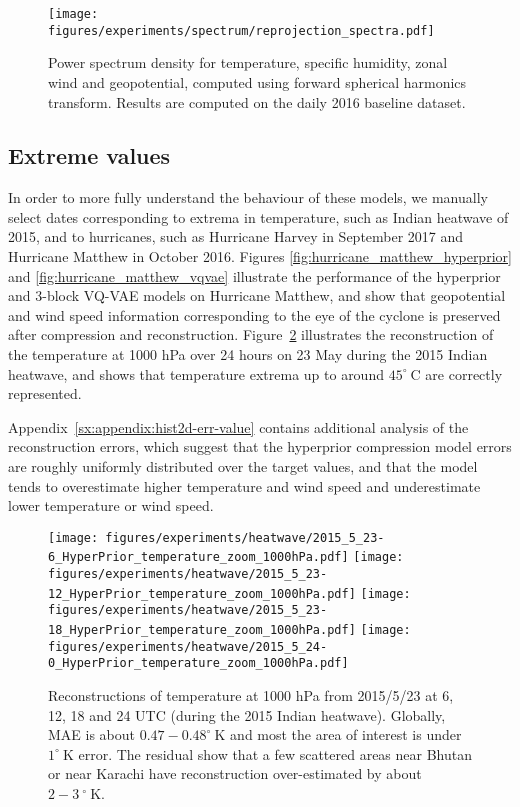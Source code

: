 \documentclass[11pt, a4paper, logo, copyright, numbering]{googledeepmind}
\begin{document}
\begin{figure}
    \centering
    \texttt{[image: figures/experiments/spectrum/reprojection\_spectra.pdf]}
    \hfill
    \caption{Power spectrum density for temperature, specific humidity, zonal wind and geopotential, computed using forward spherical harmonics transform. Results are computed on the daily 2016 baseline dataset.}
    \label{fig:spectra}
\end{figure}


\subsection{Extreme values}

In order to more fully understand the behaviour of these models, we manually select dates corresponding to extrema in temperature, such as Indian heatwave of 2015, and to hurricanes, such as Hurricane Harvey in September 2017 and Hurricane Matthew in October 2016. Figures \ref{fig:hurricane_matthew_hyperprior} and \ref{fig:hurricane_matthew_vqvae} illustrate the performance of the hyperprior and 3-block VQ-VAE models on Hurricane Matthew, and show that geopotential and wind speed information corresponding to the eye of the cyclone is preserved after compression and reconstruction. Figure~\ref{fig:heatwave} illustrates the reconstruction of the temperature at 1000 hPa over 24 hours on 23 May during the 2015 Indian heatwave, and shows that temperature extrema up to around $45^\circ~\text{C}$ are correctly represented.

Appendix~\ref{sx:appendix:hist2d-err-value} contains additional analysis of the reconstruction errors, which suggest that the hyperprior compression model errors are roughly uniformly distributed over the target values, and that the model tends to overestimate higher temperature and wind speed and underestimate lower temperature or wind speed.

\begin{figure}
    \centering
    \texttt{[image: figures/experiments/heatwave/2015\_5\_23-6\_HyperPrior\_temperature\_zoom\_1000hPa.pdf]}
    \texttt{[image: figures/experiments/heatwave/2015\_5\_23-12\_HyperPrior\_temperature\_zoom\_1000hPa.pdf]}
    \texttt{[image: figures/experiments/heatwave/2015\_5\_23-18\_HyperPrior\_temperature\_zoom\_1000hPa.pdf]}
    \texttt{[image: figures/experiments/heatwave/2015\_5\_24-0\_HyperPrior\_temperature\_zoom\_1000hPa.pdf]}
    \hfill
    \caption{Reconstructions of temperature at 1000 hPa from 2015/5/23 at 6, 12, 18 and 24 UTC (during the 2015 Indian heatwave). Globally, MAE is about $0.47-0.48^\circ~\text{K}$ and most the area of interest is under $1^\circ~\text{K}$ error. The residual show that a few scattered areas near Bhutan or near Karachi have reconstruction over-estimated by about $2-3~^\circ~\text{K}$.}
    \label{fig:heatwave}
\end{figure}
\end{document}
